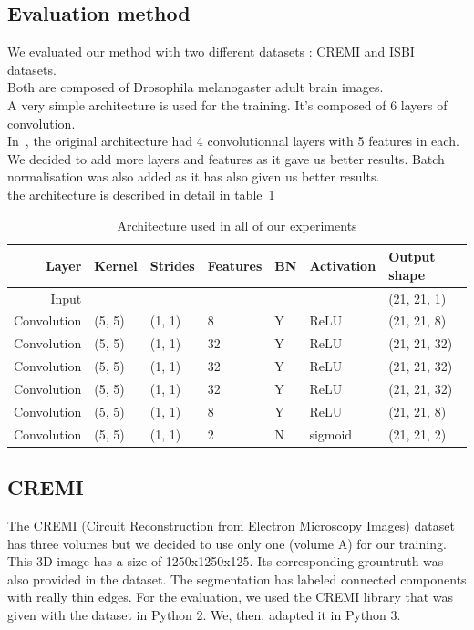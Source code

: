 \subsection{Evaluation method}
We evaluated our method with two different datasets : CREMI and ISBI datasets.\\
Both are composed of Drosophila melanogaster adult brain images.\\

A very simple architecture is used for the training.
It's composed of 6 layers of convolution.\\
In~\cite{turaga_maximin_2009}, the original architecture had 4 convolutionnal
layers with 5 features in each. We decided to add more layers and features as
it gave us better results. 
Batch normalisation was also added as it has also given us better results.\\

the architecture is described in detail in table~\ref{tab:archi}

\begin{table}[!htbp]
	\centering
	\begin{tabular}{rllllll}\toprule
		Layer & Kernel & Strides & Features & BN &  Activation & Output shape \\
		\midrule
		Input  &  &  & & & & (21, 21, 1)  \\
		Convolution & (5, 5) & (1, 1) & 8 & Y & ReLU  & (21, 21, 8)  \\
		Convolution & (5, 5) & (1, 1) & 32 & Y & ReLU  & (21, 21, 32)  \\
		Convolution & (5, 5) & (1, 1) & 32 & Y & ReLU  & (21, 21, 32)  \\
		Convolution & (5, 5) & (1, 1) & 32 & Y & ReLU  & (21, 21, 32)  \\
		Convolution & (5, 5) & (1, 1) & 8 & Y & ReLU  & (21, 21, 8)  \\
		Convolution & (5, 5) & (1, 1) & 2 & N & sigmoid  & (21, 21, 2)  \\
		\bottomrule
	\end{tabular}
	\caption{Architecture used in all of our experiments}
	\label{tab:archi}
\end{table}



\subsection{CREMI}
The CREMI (Circuit Reconstruction from Electron Microscopy Images) dataset has three volumes but we decided to use only one (volume A) for our training.\\
This 3D image has a size of 1250x1250x125. Its corresponding grountruth was also provided in the dataset. 
The segmentation has labeled connected components with really thin edges.
For the evaluation, we used the CREMI library that was given with the dataset in Python 2. We, then, adapted it in Python 3.\\

